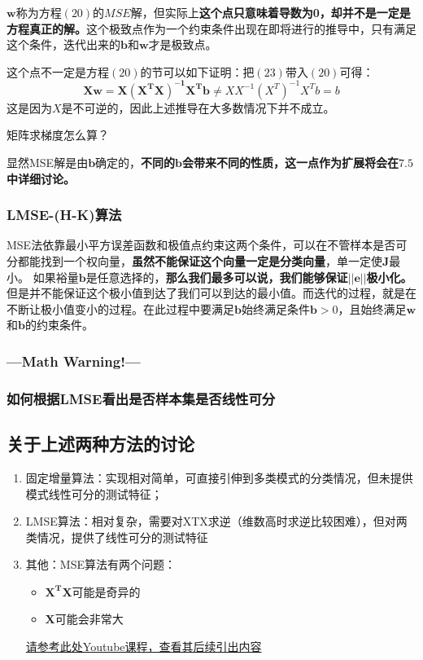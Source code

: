 \documentclass[12pt, letterpaper]{article}
\begin{document}
$\mathbf{w}$称为方程$(20)$的$MSE$解，但实际上\textbf{这个点只意味着导数为0，却并不是一定是方程真正的解。}这个极致点作为一个约束条件出现在即将进行的推导中，只有满足这个条件，迭代出来的$\mathbf{b}$和$\mathbf{w}$才是极致点。

这个点不一定是方程$(20)$的节可以如下证明：把$(23)$带入$(20)$可得：
\begin{equation}
\mathbf{Xw}=\mathbf{X(X^TX)^{-1}X^Tb}\neq XX^{-1}(X^T)^{-1}X^Tb=b
\end{equation}
这是因为$X$是不可逆的，因此上述推导在大多数情况下并不成立。


矩阵求梯度怎么算？


显然MSE解是由$\mathbf{b}$确定的，\textbf{不同的$\mathbf{b}$会带来不同的性质，这一点作为扩展将会在$7.5$中详细讨论。}

\subsubsection{LMSE-(H-K)算法}
MSE法依靠最小平方误差函数和极值点约束这两个条件，可以在不管样本是否可分都能找到一个权向量，\textbf{虽然不能保证这个向量一定是分类向量}，单一定使$\mathbf{J}$最小。
如果裕量$\mathbf{b}$是任意选择的，\textbf{那么我们最多可以说，我们能够保证$||\mathbf{e}||$极小化。}但是并不能保证这个极小值到达了我们可以到达的最小值。而迭代的过程，就是在不断让极小值变小的过程。在此过程中要满足$\mathbf{b}$始终满足条件$\mathbf{b}>0$，且始终满足$\mathbf{w}$和$\mathbf{b}$的约束条件。
\subsubsection*{---Math Warning!---}





\subsubsection{如何根据LMSE看出是否样本集是否线性可分}


\subsection{关于上述两种方法的讨论}
\begin{enumerate}
\item 
固定增量算法：实现相对简单，可直接引伸到多类模式的分类情况，但未提供模式线性可分的测试特征；
\item 
LMSE算法：相对复杂，需要对XTX求逆（维数高时求逆比较困难），但对两类情况，提供了线性可分的测试特征
\item 
其他：MSE算法有两个问题：
\begin{itemize}
\item $\mathbf{X^TX}$可能是奇异的
\item $\mathbf{X}$可能会非常大
\end{itemize}
\href{https://www.youtube.com/watch?v=sKuHAkkvQqU}{请参考此处Youtube课程，查看其后续引出内容} 

\end{enumerate}
\end{document}
